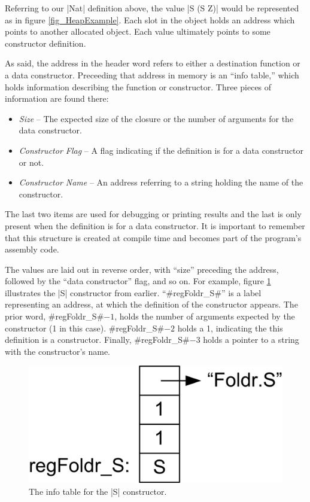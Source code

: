 \documentclass[11pt]{article}
\begin{document}
Referring to our |Nat| definition above, the value |S (S Z)| would be
represented as in figure \ref{fig_HeapExample}. Each slot in the object holds
an address which points to another allocated object. Each value
ultimately points to some constructor definition.

As said, the address in the header word refers to either a destination
function or a data constructor. Preceeding that address in memory is
an ``info table,'' which holds information describing the function or
constructor. Three pieces of information are found there:

\begin{itemize}
  \item \emph{Size} -- The expected size of the closure or the number of
    arguments for the data constructor.
  \item \emph{Constructor Flag} -- A flag indicating if the definition
    is for a data constructor or not.
  \item \emph{Constructor Name} -- An address referring to a string
    holding the name of the constructor.
\end{itemize}

The last two items are used for debugging or printing results and
the last is only present when the definition is for a data
constructor. It is important to remember that this structure is
created at compile time and becomes part of the program's assembly
code.

The values are laid out in reverse order, with ``size'' preceding the
address, followed by the ``data constructor'' flag, and so on. For
example, figure \ref{fig_SDef} illustrates the |S| constructor from
earlier. ``#regFoldr_S#'' is a label representing an address, at which
the definition of the constructor appears. The prior word, 
#regFoldr_S#$ - 1$, holds the
number of arguments expected by the constructor (1 in this
case). #regFoldr_S#$ - 2$  holds a 1, indicating the this definition is a
constructor. Finally, #regFoldr_S#$ - 3$ holds a pointer to a string with
the constructor's name.

\begin{figure}\centering
\includegraphics{fig_SDef}
\caption{The info table for the |S| constructor.}
\label{fig_SDef}
\end{figure}
\end{document}
